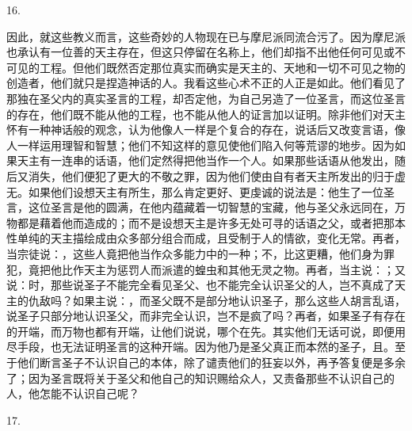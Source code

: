 16. \par

因此，就这些教义而言，这些奇妙的人物现在已与摩尼派同流合污了。因为摩尼派也承认有一位善的天主存在，但这只停留在名称上，他们却指不出他任何可见或不可见的工程。但他们既然否定那位真实而确实是天主的、天地和一切不可见之物的创造者，他们就只是捏造神话的人。我看这些心术不正的人正是如此。他们看见了那独在圣父内的真实圣言的工程，却否定他，为自己另造了一位圣言，而这位圣言的存在，他们既不能从他的工程，也不能从他人的证言加以证明。除非他们对天主怀有一种神话般的观念，认为他像人一样是个复合的存在，说话后又改变言语，像人一样运用理智和智慧；他们不知这样的意见使他们陷入何等荒谬的地步。因为如果天主有一连串的话语，他们定然得把他当作一个人。如果那些话语从他发出，随后又消失，他们便犯了更大的不敬之罪，因为他们使由自有者天主所发出的归于虚无。如果他们设想天主有所生，那么肯定更好、更虔诚的说法是：他生了一位圣言，这位圣言是他的圆满，在他内蕴藏着一切智慧的宝藏，他与圣父永远同在，万物都是藉着他而造成的；而不是设想天主是许多无处可寻的话语之父，或者把那本性单纯的天主描绘成由众多部分组合而成，且受制于人的情欲，变化无常。再者，当宗徒说：，这些人竟把他当作众多能力中的一种；不，比这更糟，他们身为罪犯，竟把他比作天主为惩罚人而派遣的蝗虫和其他无灵之物。再者，当主说：；又说：时，那些说圣子不能完全看见圣父、也不能完全认识圣父的人，岂不真成了天主的仇敌吗？如果主说：，而圣父既不是部分地认识圣子，那么这些人胡言乱语，说圣子只部分地认识圣父，而非完全认识，岂不是疯了吗？再者，如果圣子有存在的开端，而万物也都有开端，让他们说说，哪个在先。其实他们无话可说，即便用尽手段，也无法证明圣言的这种开端。因为他乃是圣父真正而本然的圣子，且。至于他们断言圣子不认识自己的本体，除了谴责他们的狂妄以外，再予答复便是多余了；因为圣言既将关于圣父和他自己的知识赐给众人，又责备那些不认识自己的人，他怎能不认识自己呢？\par

17. \par

